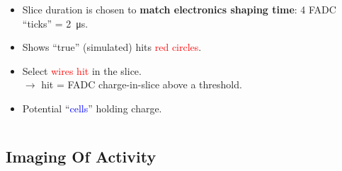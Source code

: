 \documentclass[xcolor=dvipsnames]{beamer}
\begin{document}
\begin{frame}[fragile]
\begin{columns}
\begin{column}{0.65\textwidth}
      \begin{itemize} \scriptsize
      \item Slice duration is chosen to \textbf{match
          electronics shaping time}: 4 FADC ``ticks'' =
        \SI{2}{\micro\second}.
      \item Shows ``true'' (simulated) hits \textcolor{red}{red circles}.
      \item Select \textcolor{red}{wires hit} in the slice.\\
        $\rightarrow$ hit = FADC charge-in-slice above a threshold.
      \item Potential ``\textcolor{blue}{cells}'' holding charge.
      \end{itemize}
    \end{column}
  \end{columns}

\end{frame}

\subsection{Imaging Of Activity}
\end{document}
